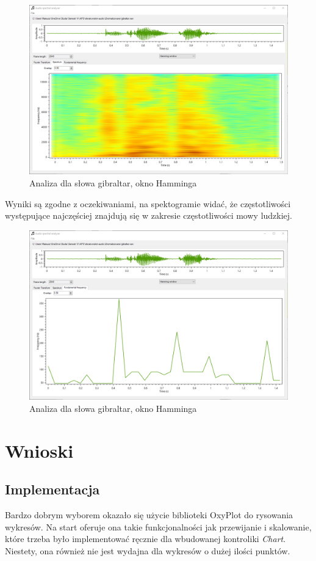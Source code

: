 \documentclass{article}
\begin{document}
\begin{figure}[H]
\includegraphics[width=6in]{scr10.png}
\centering
\caption{Analiza dla słowa gibraltar, okno Hamminga}
\end{figure}

Wyniki są zgodne z oczekiwaniami, na spektogramie widać, że częstotliwości występujące najczęściej znajdują się w zakresie częstotliwości mowy ludzkiej.

\begin{figure}[H]
\includegraphics[width=6in]{scr11.png}
\centering
\caption{Analiza dla słowa gibraltar, okno Hamminga}
\end{figure}

\section{Wnioski}
\subsection{Implementacja}
Bardzo dobrym wyborem okazało się użycie biblioteki OxyPlot do rysowania wykresów. Na start oferuje ona takie funkcjonalności jak przewijanie i skalowanie, które trzeba było implementować ręcznie dla wbudowanej kontroliki \textit{Chart}. Niestety, ona również nie jest wydajna dla wykresów o dużej ilości punktów.
\end{document}
